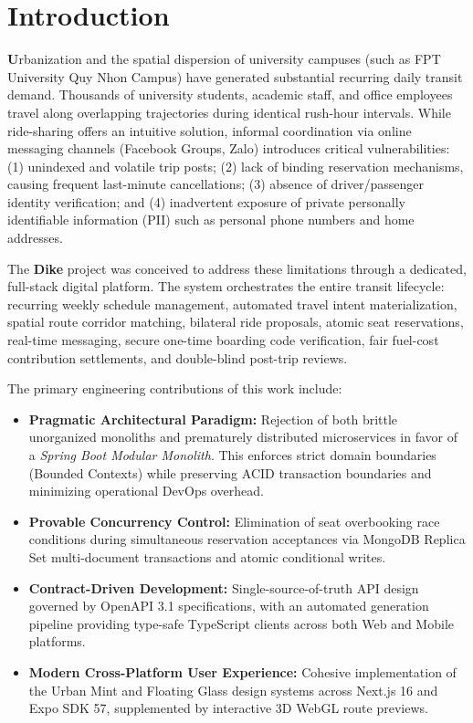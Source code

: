 \documentclass[conference,10pt,a4paper]{IEEEtran}
\begin{document}
\section{Introduction}
\textbf{U}rbanization and the spatial dispersion of university campuses (such as FPT University Quy Nhon Campus) have generated substantial recurring daily transit demand. Thousands of university students, academic staff, and office employees travel along overlapping trajectories during identical rush-hour intervals. While ride-sharing offers an intuitive solution, informal coordination via online messaging channels (Facebook Groups, Zalo) introduces critical vulnerabilities: (1) unindexed and volatile trip posts; (2) lack of binding reservation mechanisms, causing frequent last-minute cancellations; (3) absence of driver/passenger identity verification; and (4) inadvertent exposure of private personally identifiable information (PII) such as personal phone numbers and home addresses.

The \textbf{Dike} project was conceived to address these limitations through a dedicated, full-stack digital platform. The system orchestrates the entire transit lifecycle: recurring weekly schedule management, automated travel intent materialization, spatial route corridor matching, bilateral ride proposals, atomic seat reservations, real-time messaging, secure one-time boarding code verification, fair fuel-cost contribution settlements, and double-blind post-trip reviews.

The primary engineering contributions of this work include:
\begin{itemize}
    \item \textbf{Pragmatic Architectural Paradigm:} Rejection of both brittle unorganized monoliths and prematurely distributed microservices in favor of a \textit{Spring Boot Modular Monolith}. This enforces strict domain boundaries (Bounded Contexts) while preserving ACID transaction boundaries and minimizing operational DevOps overhead.
    \item \textbf{Provable Concurrency Control:} Elimination of seat overbooking race conditions during simultaneous reservation acceptances via MongoDB Replica Set multi-document transactions and atomic conditional writes.
    \item \textbf{Contract-Driven Development:} Single-source-of-truth API design governed by OpenAPI 3.1 specifications, with an automated generation pipeline providing type-safe TypeScript clients across both Web and Mobile platforms.
    \item \textbf{Modern Cross-Platform User Experience:} Cohesive implementation of the Urban Mint and Floating Glass design systems across Next.js 16 and Expo SDK 57, supplemented by interactive 3D WebGL route previews.
\end{itemize}
\end{document}
